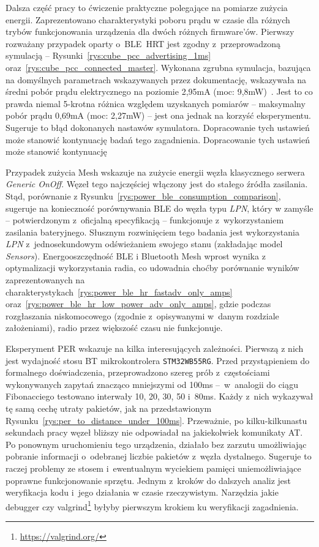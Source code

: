 Dalsza część pracy to ćwiczenie praktyczne polegające na pomiarze zużycia energii. Zaprezentowano
charakterystyki poboru prądu w czasie dla różnych trybów funkcjonowania urządzenia dla dwóch różnych firmware'ów.
Pierwszy rozważany przypadek oparty o~BLE~\gls{HRT} jest zgodny z~przeprowadzoną symulacją -- 
Rysunki~\ref{rys:cube_pcc_advertising_1ms} oraz~\ref{rys:cube_pcc_connected_master}. Wykonana zgrubna symulacja,
bazująca na domyślnych parametrach wskazywanych przez dokumentację,
wskazywała na średni pobór prądu elektrycznego na poziomie 2,95mA (moc: 9,8mW)~\cite{noauthor_um1718_2022}. Jest to co prawda niemal
5-krotna różnica względem uzyskanych pomiarów -- maksymalny pobór prądu 0,69mA (moc: 2,27mW) -- jest ona jednak na korzyść
eksperymentu. Sugeruje to błąd dokonanych nastawów symulatora. Dopracowanie tych ustawień może stanowić kontynuację
badań tego zagadnienia. Dopracowanie tych ustawień może stanowić kontynuację

Przypadek zużycia Mesh wskazuje na zużycie energii węzła klasycznego serwera \textit{Generic OnOff}. Węzeł tego
najczęściej włączony jest do stałego źródła zasilania. Stąd, porównanie z Rysunku~\ref{rys:power_ble_consumption_comparison},
sugeruje na konieczność porównywania BLE do węzła typu \textit{LPN}, który w zamyśle -- potwierdzonym z~oficjalną specyfikacją
-- funkcjonuje z~wykorzystaniem zasilania bateryjnego. Słusznym rozwinięciem tego badania jest wykorzystania
\textit{LPN} z~jednosekundowym odświeżaniem swojego stanu (zakładając model \textit{Sensors}). Energooszczędność
BLE i Bluetooth Mesh wprost wynika z optymalizacji wykorzystania radia, co udowadnia choćby porównanie
wyników zaprezentowanych na charakterystykach~\ref{rys:power_ble_hr_fastadv_only_amps} oraz~\ref{rys:power_ble_hr_low_power_adv_only_amps},
gdzie podczas rozgłaszania niskomocowego (zgodnie z~opisywanymi w~danym rozdziale założeniami), radio przez większość
czasu nie funkcjonuje.

Eksperyment PER wskazuje na kilka interesujących zależności. Pierwszą z nich jest wydajność stosu \gls{BT} mikrokontrolera \texttt{STM32WB55RG}.
Przed przystąpieniem do formalnego doświadczenia, przeprowadzono szereg prób z~częstościami wykonywanych zapytań
znacząco mniejszymi od 100ms --~w~analogii do ciągu Fibonacciego testowano interwały 10, 20, 30, 50 i~80ms. Każdy z~nich wykazywał
tę samą cechę utraty pakietów, jak na przedstawionym Rysunku~\ref{rys:per_to_distance_under_100ms}. Przeważnie,
po kilku-kilkunastu sekundach pracy węzeł bliższy nie odpowiadał na jakiekolwiek komunikaty AT. Po ponownym uruchomieniu tego urządzenia,
działało bez zarzutu umożliwiając pobranie informacji o~odebranej liczbie pakietów z~węzła dystalnego.
Sugeruje to raczej problemy ze stosem i~ewentualnym wyciekiem pamięci uniemożliwiające poprawne funkcjonowanie sprzętu.
Jednym z~kroków do dalszych analiz jest weryfikacja kodu i~jego działania w czasie rzeczywistym. Narzędzia jakie debugger
czy valgrind\footnote{\url{https://valgrind.org/}} byłyby pierwszym krokiem ku weryfikacji zagadnienia.


